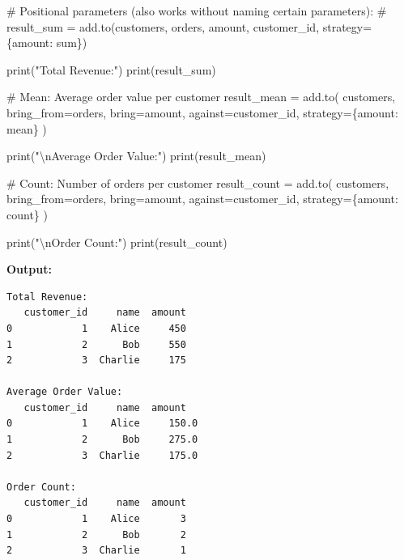 \documentclass[
  letterpaper,
]{scrbook}
\newenvironment{Shaded}{\begin{snugshade}}{\end{snugshade}}
\newcommand{\BuiltInTok}[1]{\textcolor[rgb]{0.00,0.23,0.31}{#1}}
\newcommand{\CharTok}[1]{\textcolor[rgb]{0.13,0.47,0.30}{#1}}
\newcommand{\CommentTok}[1]{\textcolor[rgb]{0.37,0.37,0.37}{#1}}
\newcommand{\NormalTok}[1]{\textcolor[rgb]{0.00,0.23,0.31}{#1}}
\newcommand{\OperatorTok}[1]{\textcolor[rgb]{0.37,0.37,0.37}{#1}}
\newcommand{\StringTok}[1]{\textcolor[rgb]{0.13,0.47,0.30}{#1}}
\begin{document}
\begin{Shaded}
\begin{Highlighting}[]
\CommentTok{\# Positional parameters (also works without naming certain parameters):}
\CommentTok{\# result\_sum = add.to(customers, orders, \textquotesingle{}amount\textquotesingle{}, \textquotesingle{}customer\_id\textquotesingle{}, strategy=\{\textquotesingle{}amount\textquotesingle{}: \textquotesingle{}sum\textquotesingle{}\})}

\BuiltInTok{print}\NormalTok{(}\StringTok{"Total Revenue:"}\NormalTok{)}
\BuiltInTok{print}\NormalTok{(result\_sum)}

\CommentTok{\# Mean: Average order value per customer}
\NormalTok{result\_mean }\OperatorTok{=}\NormalTok{ add.to(}
\NormalTok{    customers,}
\NormalTok{    bring\_from}\OperatorTok{=}\NormalTok{orders,}
\NormalTok{    bring}\OperatorTok{=}\StringTok{\textquotesingle{}amount\textquotesingle{}}\NormalTok{,}
\NormalTok{    against}\OperatorTok{=}\StringTok{\textquotesingle{}customer\_id\textquotesingle{}}\NormalTok{,}
\NormalTok{    strategy}\OperatorTok{=}\NormalTok{\{}\StringTok{\textquotesingle{}amount\textquotesingle{}}\NormalTok{: }\StringTok{\textquotesingle{}mean\textquotesingle{}}\NormalTok{\}}
\NormalTok{)}

\BuiltInTok{print}\NormalTok{(}\StringTok{"}\CharTok{\textbackslash{}n}\StringTok{Average Order Value:"}\NormalTok{)}
\BuiltInTok{print}\NormalTok{(result\_mean)}

\CommentTok{\# Count: Number of orders per customer}
\NormalTok{result\_count }\OperatorTok{=}\NormalTok{ add.to(}
\NormalTok{    customers,}
\NormalTok{    bring\_from}\OperatorTok{=}\NormalTok{orders,}
\NormalTok{    bring}\OperatorTok{=}\StringTok{\textquotesingle{}amount\textquotesingle{}}\NormalTok{,}
\NormalTok{    against}\OperatorTok{=}\StringTok{\textquotesingle{}customer\_id\textquotesingle{}}\NormalTok{,}
\NormalTok{    strategy}\OperatorTok{=}\NormalTok{\{}\StringTok{\textquotesingle{}amount\textquotesingle{}}\NormalTok{: }\StringTok{\textquotesingle{}count\textquotesingle{}}\NormalTok{\}}
\NormalTok{)}

\BuiltInTok{print}\NormalTok{(}\StringTok{"}\CharTok{\textbackslash{}n}\StringTok{Order Count:"}\NormalTok{)}
\BuiltInTok{print}\NormalTok{(result\_count)}
\end{Highlighting}
\end{Shaded}

\textbf{Output:}

\begin{verbatim}
Total Revenue:
   customer_id     name  amount
0            1    Alice     450
1            2      Bob     550
2            3  Charlie     175

Average Order Value:
   customer_id     name  amount
0            1    Alice     150.0
1            2      Bob     275.0
2            3  Charlie     175.0

Order Count:
   customer_id     name  amount
0            1    Alice       3
1            2      Bob       2
2            3  Charlie       1
\end{verbatim}
\end{document}
